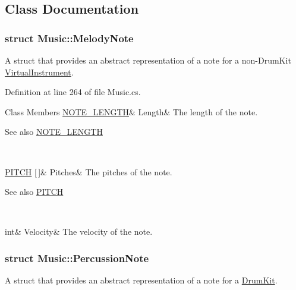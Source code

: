 \subsection{Class Documentation}
\label{struct_music_1_1_melody_note}
\subsubsection{struct Music\+:\+:Melody\+Note}
A struct that provides an abstract representation of a note for a non-\/\+Drum\+Kit \hyperlink{class_virtual_instrument}{Virtual\+Instrument}. 

Definition at line 264 of file Music.\+cs.

\begin{DoxyFields}{Class Members}
\mbox{\label{group___music_structs_ac35cd02f5b3c00e3040b51e40e9e6c94}} 
\hyperlink{group___music_enums_gaf11b5f079adbb21c800b9eca1c5c3cbd}{NOTE\_LENGTH}&
Length&
The length of the note. \begin{DoxySeeAlso}{See also}
\hyperlink{group___music_enums_gaf11b5f079adbb21c800b9eca1c5c3cbd}{N\+O\+T\+E\+\_\+\+L\+E\+N\+G\+TH} 
\end{DoxySeeAlso}
\\
\hline

\mbox{\label{group___music_structs_aab23b49ea9d7961aef5091154ce45946}} 
\hyperlink{group___music_enums_ga508f69b199ea518f935486c990edac1d}{PITCH} \mbox{[}$\,$\mbox{]}&
Pitches&
The pitches of the note. \begin{DoxySeeAlso}{See also}
\hyperlink{group___music_enums_ga508f69b199ea518f935486c990edac1d}{P\+I\+T\+CH} 
\end{DoxySeeAlso}
\\
\hline

\mbox{\label{group___music_structs_a0c87d54ce8d28ea08fb4a526cb821c20}} 
int&
Velocity&
The velocity of the note. \\
\hline

\end{DoxyFields}
\label{struct_music_1_1_percussion_note}
\subsubsection{struct Music\+:\+:Percussion\+Note}
A struct that provides an abstract representation of a note for a \hyperlink{class_drum_kit}{Drum\+Kit}. 

